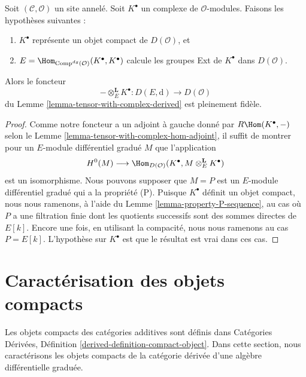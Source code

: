 \begin{lemma}
\label{lemma-fully-faithful-in-compact-case}
Soit $(\mathcal{C}, \mathcal{O})$ un site annelé. Soit $K^\bullet$ un complexe de
$\mathcal{O}$-modules. Faisons les hypothèses suivantes :
\begin{enumerate}
\item $K^\bullet$ représente un objet compact de $D(\mathcal{O})$, et
\item $E = \Hom_{\text{Comp}^{dg}(\mathcal{O})}(K^\bullet, K^\bullet)$ calcule les
groupes Ext de $K^\bullet$ dans $D(\mathcal{O})$.
\end{enumerate}
Alors le foncteur
$$
- \otimes_E^\mathbf{L} K^\bullet :
D(E, \text{d})
\longrightarrow
D(\mathcal{O})
$$
du Lemme \ref{lemma-tensor-with-complex-derived} est pleinement fidèle.
\end{lemma}

\begin{proof}
Comme notre foncteur a un adjoint à gauche donné par $R\Hom(K^\bullet, -)$ selon
le Lemme \ref{lemma-tensor-with-complex-hom-adjoint}, il suffit de montrer pour un
$E$-module différentiel gradué $M$ que l'application
$$
H^0(M) \longrightarrow
\Hom_{D(\mathcal{O})}(K^\bullet, M \otimes_E^\mathbf{L} K^\bullet)
$$
est un isomorphisme. Nous pouvons supposer que $M = P$ est un $E$-module
différentiel gradué qui a la propriété (P). Puisque $K^\bullet$ définit un objet
compact, nous nous ramenons, à l'aide du Lemme \ref{lemma-property-P-sequence}, au
cas où $P$ a une filtration finie dont les quotients successifs sont des sommes
directes de $E[k]$. Encore une fois, en utilisant la compacité, nous nous ramenons au
cas $P = E[k]$. L'hypothèse sur $K^\bullet$ est que le résultat est vrai dans
ces cas.
\end{proof}











\section{Caractérisation des objets compacts}
\label{section-compact}

\noindent
Les objets compacts des catégories additives sont définis dans Catégories
Dérivées, Définition \ref{derived-definition-compact-object}. Dans cette section,
nous caractérisons les objets compacts de la catégorie dérivée d'une algèbre
différentielle graduée.

